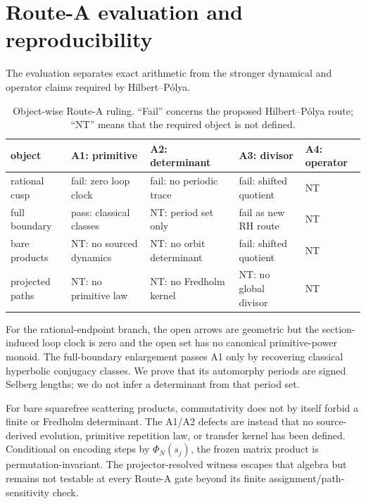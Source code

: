 \section{Route-A evaluation and reproducibility}

The evaluation separates exact arithmetic from the stronger dynamical and
operator claims required by Hilbert--P\'olya.

\begin{table}[t]
\centering
\small
\caption{Object-wise Route-A ruling.  ``Fail'' concerns the proposed
Hilbert--P\'olya route; ``NT'' means that the required object is not defined.}
\begin{tabular}{@{}
>{\raggedright\arraybackslash}p{}
>{\raggedright\arraybackslash}p{}
>{\raggedright\arraybackslash}p{}
>{\raggedright\arraybackslash}p{}
>{\raggedright\arraybackslash}p{}@{}}
\toprule
object & A1: primitive & A2: determinant & A3: divisor & A4: operator \\
\midrule
rational cusp & fail: zero loop clock & fail: no periodic trace & fail: shifted quotient & NT \\
full boundary & pass: classical classes & NT: period set only & fail as new RH route & NT \\
bare products & NT: no sourced dynamics & NT: no orbit determinant & fail: shifted quotient & NT \\
projected paths & NT: no primitive law & NT: no Fredholm kernel & NT: no global divisor & NT \\
\bottomrule
\end{tabular}
\label{tab:route-a}
\end{table}

For the rational-endpoint branch, the open arrows are geometric but the
section-induced loop clock is zero and the open set has no canonical
primitive-power monoid.  The full-boundary enlargement passes A1 only by
recovering classical hyperbolic conjugacy classes.  We prove that its
automorphy periods are signed Selberg lengths; we do not infer a determinant
from that period set.

For bare squarefree scattering products, commutativity does not by itself
forbid a finite or Fredholm determinant.  The A1/A2 defects are instead that
no source-derived evolution, primitive repetition law, or transfer kernel has
been defined.  Conditional on encoding steps by \(\Phi_N(s_j)\), the frozen
matrix product is permutation-invariant.  The projector-resolved witness
escapes that algebra but remains not testable at every Route-A gate beyond its
finite assignment/path-sensitivity check.


